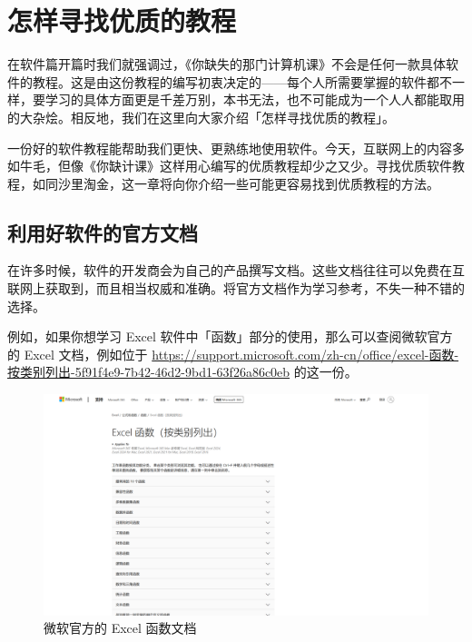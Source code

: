 \chapter{怎样寻找优质的教程}
\label{cha:how-to-find-tutorials}

\begin{intro}
  在软件篇开篇时我们就强调过，《你缺失的那门计算机课》不会是任何一款具体软件的教程。这是由这份教程的编写初衷决定的——每个人所需要掌握的软件都不一样，要学习的具体方面更是千差万别，本书无法，也不可能成为一个人人都能取用的大杂烩。相反地，我们在这里向大家介绍「怎样寻找优质的教程」。
\end{intro}

一份好的软件教程能帮助我们更快、更熟练地使用软件。今天，互联网上的内容多如牛毛，但像《你缺计课》这样用心编写的优质教程却少之又少。寻找优质软件教程，如同沙里淘金，这一章将向你介绍一些可能更容易找到优质教程的方法。

\section{利用好软件的官方文档}

在许多时候，软件的开发商会为自己的产品撰写文档。这些文档往往可以免费在互联网上获取到，而且相当权威和准确。将官方文档作为学习参考，不失一种不错的选择。

例如，如果你想学习 Excel 软件中「函数」部分的使用，那么可以查阅微软官方的 Excel 文档，例如位于 \url{https://support.microsoft.com/zh-cn/office/excel-函数-按类别列出-5f91f4e9-7b42-46d2-9bd1-63f26a86c0eb} 的这一份。

\begin{figure}[htb!]
  \centering
  \includegraphics[width=.9\textwidth]{assets/software/MS_document_for_Excel.png}
  \caption{微软官方的 Excel 函数文档}
  \label{fig:MS_document_for_Excel}
\end{figure}

